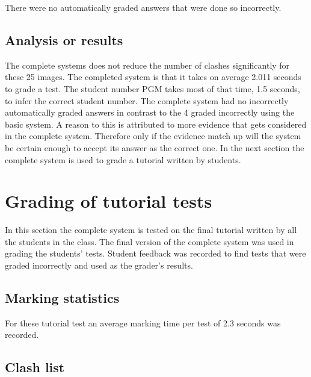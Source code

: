 There were no automatically graded answers that were done so incorrectly.

\subsection{Analysis or results}

The complete systems does not reduce the number of clashes significantly for these 25 images. The completed system is that it takes on average 2.011 seconds to grade a test. The student number PGM takes most of that time, 1.5 seconds, to infer the correct student number. The complete system had no incorrectly automatically graded answers in contrast to the 4 graded incorrectly using the basic system. A reason to this is attributed to more evidence that gets considered in the complete system. Therefore only if the evidence match up will the system be certain enough to accept its answer as the correct one. In the next section the complete system is used to grade a tutorial written by students. 

\section{Grading of tutorial tests}
In this section the complete system is tested on the final tutorial written by all the students in the class. The final version of the complete system was used in grading the students' tests. Student feedback was recorded to find tests that were graded incorrectly and used as the grader's results. 

\subsection{Marking statistics}

For these tutorial test  an average marking time per test of 2.3 seconds was recorded.

\subsection{Clash list}

